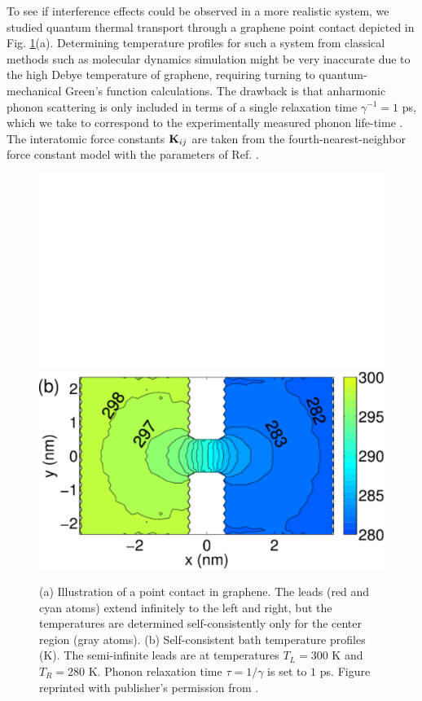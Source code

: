 To see if interference effects could be observed in a more realistic system, we studied quantum thermal transport through a graphene point contact depicted in Fig. \ref{fig:gf_fig8}(a). Determining temperature profiles for such a system from classical methods such as molecular dynamics simulation might be very inaccurate due to the high Debye temperature of graphene, requiring turning to quantum-mechanical Green's function calculations. The drawback is that anharmonic phonon scattering is only included in terms of a single relaxation time $\gamma^{-1}=1$ ps, which we take to correspond to the experimentally measured phonon life-time \cite{bonini12}. The interatomic force constants $\mathbf{K}_{ij}$ are taken from the fourth-nearest-neighbor force constant model \cite{saito} with the parameters of Ref. \cite{wirtz04}. %

\begin{figure}
 \begin{center}
 \includegraphics[width=.49\columnwidth]{pics/gf_fig8a.pdf}
 \includegraphics[width=.49\columnwidth]{pics/gf_fig8b.pdf}
 \end{center}
 \caption{(a) Illustration of a point contact in graphene. The leads (red and cyan atoms) extend infinitely to the left and right, but the temperatures are determined self-consistently only for the center region (gray atoms). (b) Self-consistent bath temperature profiles (K). The semi-infinite leads are at temperatures $T_L=300$ K and $T_R=280$ K. Phonon relaxation time $\tau=1/\gamma$ is set to $1$ ps. Figure reprinted with publisher's permission from .}
 \label{fig:gf_fig8}
\end{figure}

